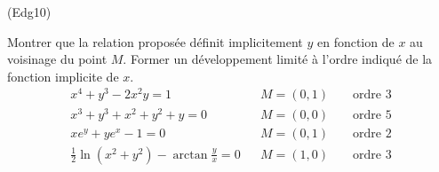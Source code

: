 \begin{tiny}(Edg10)\end{tiny}
Montrer que la relation propos{\'e}e d{\'e}finit implicitement $y$
en fonction de $x$ au voisinage du point $M$. Former un
d{\'e}veloppement limit{\'e} {\`a} l'ordre indiqu{\'e} de la fonction
implicite de $x$.
\begin{align*}
  x^4+y^3-2x^2y=1 & & M=(0,1) & & \text{ ordre } 3\\
  x^3+y^3+x^2+y^2+y=0 & & M=(0,0) & & \text{ ordre } 5\\
  xe^y+ye^x-1=0 & & M=(0,1) & & \text{ ordre } 2\\
  \frac{1}{2}\ln(x^2+y^2)-\arctan\frac{y}{x}=0 & & M=(1,0) & & \text{ ordre } 3
\end{align*}